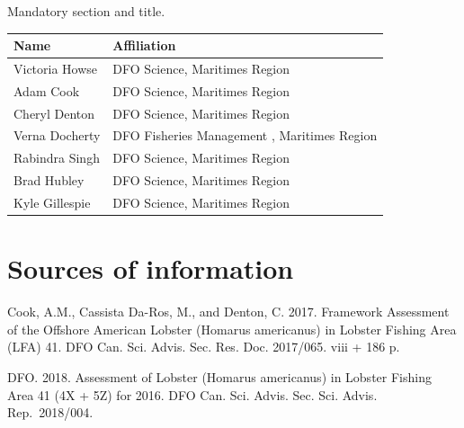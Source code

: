 \documentclass[11pt]{book}
\begin{document}
Mandatory section and title.
\begin{longtable}[]{@{}ll@{}}
\toprule
Name & Affiliation\tabularnewline
\midrule
\endhead
Victoria Howse & DFO Science, Maritimes Region\tabularnewline
Adam Cook & DFO Science, Maritimes Region\tabularnewline
Cheryl Denton & DFO Science, Maritimes Region\tabularnewline
Verna Docherty & DFO Fisheries Management , Maritimes Region\tabularnewline
Rabindra Singh & DFO Science, Maritimes Region\tabularnewline
Brad Hubley & DFO Science, Maritimes Region\tabularnewline
Kyle Gillespie & DFO Science, Maritimes Region\tabularnewline
\bottomrule
\end{longtable}
\MakeApproval

\hypertarget{sources-of-information}{%
\section{Sources of information}\label{sources-of-information}}

Cook, A.M., Cassista Da-Ros, M., and Denton, C. 2017. Framework Assessment of the Offshore American Lobster (Homarus americanus) in Lobster Fishing Area (LFA) 41. DFO Can. Sci. Advis. Sec. Res. Doc. 2017/065. viii + 186 p.

DFO. 2018. Assessment of Lobster (Homarus americanus) in Lobster Fishing Area 41 (4X + 5Z) for 2016. DFO Can. Sci. Advis. Sec. Sci. Advis. Rep.~2018/004.

\MakeAvailable
\end{document}
